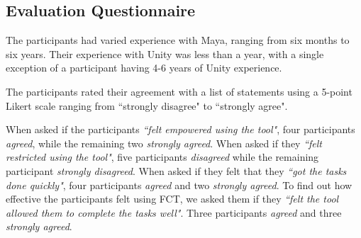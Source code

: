 \subsection{Evaluation Questionnaire}
The participants had varied experience with Maya, ranging from six months to six years. Their experience with Unity was less than a year, with a single exception of a participant having 4-6 years of Unity experience.

The participants rated their agreement with a list of statements using a 5-point Likert scale ranging from ``strongly disagree" to ``strongly agree". 


When asked if the participants \textit{``felt empowered using the tool"}, four participants \textit{agreed}, while the remaining two \textit{strongly agreed}. When asked if they \textit{``felt restricted using the tool"}, five participants \textit{disagreed} while the remaining participant \textit{strongly disagreed}. When asked if they felt that they \textit{``got the tasks done quickly"}, four participants \textit{agreed} and two \textit{strongly agreed}. To find out how effective the participants felt using FCT, we asked them if they \textit{``felt the tool allowed them to complete the tasks well"}. Three participants \textit{agreed} and three \textit{strongly agreed}.


